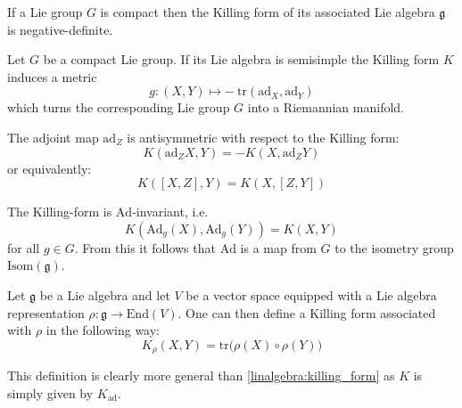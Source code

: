 	\begin{property}
		If a Lie group $G$ is compact then the Killing form of its associated Lie algebra $\mathfrak{g}$ is negative-definite.
	\end{property}
	\begin{result}
		Let $G$ be a compact Lie group. If its Lie algebra is semisimple the Killing form $K$ induces a metric
                \begin{equation}
                	g:(X, Y)\mapsto -\ \text{tr}(\text{ad}_X, \text{ad}_Y)
                \end{equation}
                which turns the corresponding Lie group $G$ into a Riemannian manifold.
	\end{result}
            
	\begin{property}
		The adjoint map $\text{ad}_Z$ is antisymmetric with respect to the Killing form:
		\begin{equation}
			\label{lie:ad_killing_form}
			K(\text{ad}_ZX, Y) = -K(X, \text{ad}_ZY)
		\end{equation}
		or equivalently:
		\begin{equation}
			K([X, Z], Y) = K(X, [Z, Y])
		\end{equation}
	\end{property}
	\begin{property}
		The Killing-form is $\text{Ad}$-invariant, i.e.
                \begin{equation}
                    K(\text{Ad}_g(X), \text{Ad}_g(Y)) = K(X, Y)
		\end{equation}
                for all $g\in G$. From this it follows that $\text{Ad}$ is a map from $G$ to the isometry group $\text{Isom}(\mathfrak{g})$.
	\end{property}
	
	\begin{definition}
		Let $\mathfrak{g}$ be a Lie algebra and let $V$ be a vector space equipped with a Lie algebra representation $\rho:\mathfrak{g}\rightarrow\text{End}(V)$. One can then define a Killing form associated with $\rho$ in the following way:
		\begin{equation}
			\label{lie:rho_killing_form}
			K_\rho(X, Y) = \text{tr}\Big(\rho(X)\circ\rho(Y)\Big)
		\end{equation}
	\end{definition}
	\begin{remark}
		This definition is clearly more general than \ref{linalgebra:killing_form} as $K$ is simply given by $K_{\text{ad}}$.
	\end{remark}
	

